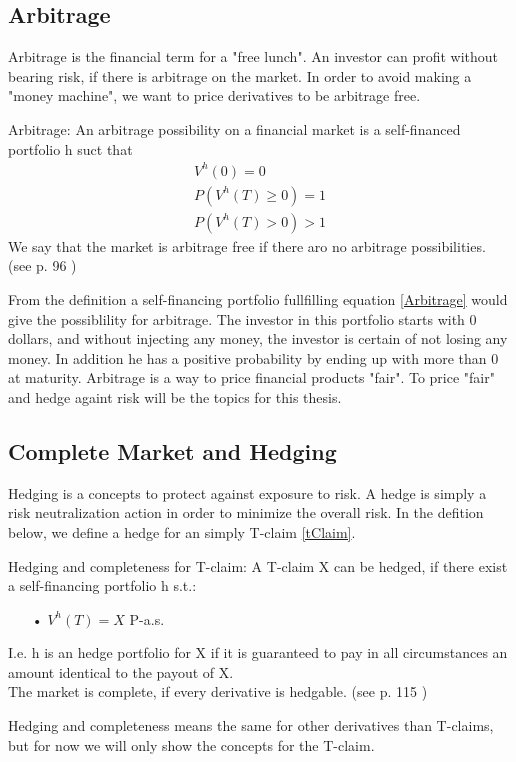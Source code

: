 \subsection{Arbitrage}
Arbitrage is the financial term for a "free lunch". An investor can profit without bearing risk, if there is arbitrage on the market. In order to avoid making a "money machine", we want to price derivatives to be arbitrage free.  
\theoremstyle{definition}
\begin{definition}{Arbitrage:}
An arbitrage possibility on a financial market is a self-financed portfolio h suct that
\begin{equation}\label{Arbitrage}
\begin{split}
V^{h}(0)=0\\
P(V^{h}(T)\geq 0)=1\\
P(V^{h}(T)>0)>1
\end{split}
\end{equation}
We say that the market is arbitrage free if there aro no arbitrage possibilities.\\
(see p. 96 \parencite{finKont})
\end{definition}
From the definition a self-financing portfolio fullfilling equation \eqref{Arbitrage} would give the possiblility for arbitrage. The investor in this portfolio starts with 0 dollars, and without injecting any money, the investor is certain of not losing any money. In addition he has a positive probability by ending up with more than 0 at maturity. Arbitrage is a way to price financial products "fair". To price "fair" and hedge againt risk will be the topics for this thesis.


\subsection{Complete Market and Hedging}
Hedging is a concepts to protect against exposure to risk. A hedge is simply a risk neutralization action in order to minimize the overall risk. In the defition below, we define a hedge for an simply T-claim \eqref{tClaim}.
\theoremstyle{definition}
\begin{definition}{Hedging and completeness for T-claim:}
A T-claim X can be hedged, if there exist a self-financing portfolio h s.t.:
\begin{enumerate}
\item[•] $V^{h}(T)=X$ P-a.s.
\end{enumerate}
I.e. h is an hedge portfolio for X if it is guaranteed to pay in all circumstances an amount identical to the payout of X.\\
The market is complete, if every derivative is hedgable.
(see p. 115 \parencite{finKont})
\end{definition}
Hedging and completeness means the same for other derivatives than T-claims, but for now we will only show the concepts for the T-claim.

